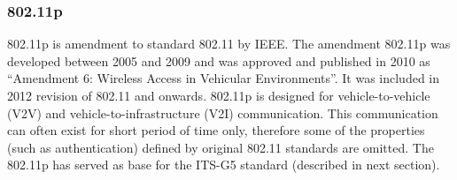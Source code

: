 \subsubsection{802.11p}
% 
802.11p is amendment to standard 802.11 by IEEE. The amendment 802.11p was developed between 2005 and 2009 and was approved and published in 2010 as \enquote{Amendment 6: Wireless Access in Vehicular Environments}. It was included in 2012 revision of 802.11 and onwards.
802.11p is designed for vehicle-to-vehicle (V2V) and vehicle-to-infrastructure (V2I) communication. This communication can often exist for short period of time only, therefore some of the properties (such as authentication) defined by original 802.11 standards are omitted. The 802.11p has served as base for the ITS-G5 standard (described in next section).\par
% 
% 

